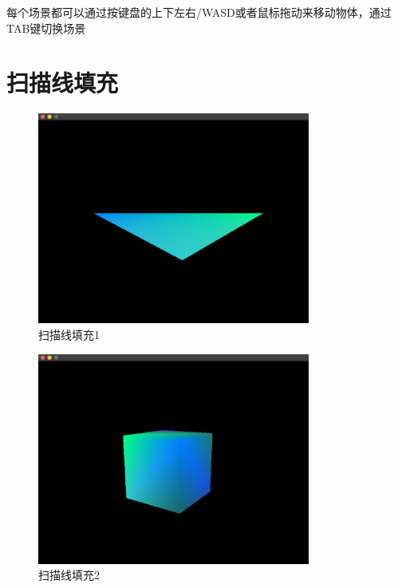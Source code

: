     每个场景都可以通过按键盘的上下左右/WASD或者鼠标拖动来移动物体，通过TAB键切换场景
    
    \section{扫描线填充}
    
        \begin{figure}[H]
    	\centering
		\includegraphics[width=0.8\textwidth]{images/demo5.png}
		\caption{扫描线填充1}
		\label{demo5}
    \end{figure}  
    
        \begin{figure}[H]
    	\centering
		\includegraphics[width=0.8\textwidth]{images/demo11.png}
		\caption{扫描线填充2}
		\label{demo11}
    \end{figure} 
    
